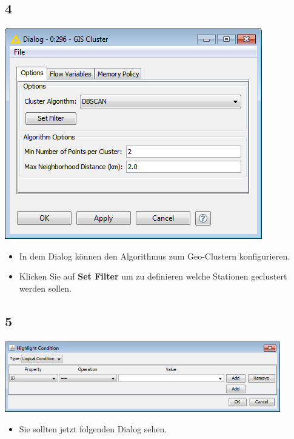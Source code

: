 \documentclass{beamer}
\begin{document}
\subsection{4}
\begin{frame}
	\begin{center}
  		\includegraphics[height=0.6\textheight]{4.png}
	\end{center}
	\begin{itemize}
		\item In dem Dialog können den Algorithmus zum Geo-Clustern konfigurieren.
		\item Klicken Sie auf \textbf{Set Filter} um zu definieren welche Stationen geclustert werden sollen.
	\end{itemize}
\end{frame}

\subsection{5}
\begin{frame}
	\begin{center}
  		\includegraphics[width=0.9\textwidth]{5.png}
	\end{center}
	\begin{itemize}
		\item Sie sollten jetzt folgenden Dialog sehen.
	\end{itemize}
\end{frame}
\end{document}
